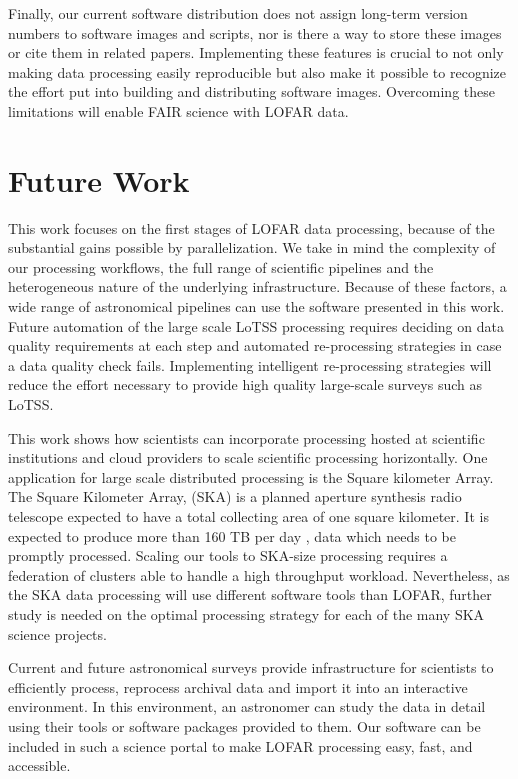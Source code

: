 Finally, our current software distribution does not assign long-term version numbers to software images and scripts, nor is there a way to store these images or cite them in related papers. Implementing these features is crucial to not only making data processing easily reproducible but also make it possible to recognize the effort put into building and distributing software images. Overcoming these limitations will enable FAIR science with LOFAR data\citep{wilkinson2016fair}.


\section{Future Work}

This work focuses on the first stages of LOFAR data processing, because of the substantial gains possible by parallelization. We take in mind the complexity of our processing workflows, the full range of scientific pipelines and the heterogeneous nature of the underlying infrastructure. Because of these factors, a wide range of astronomical pipelines can use the software presented in this work. Future automation of the large scale LoTSS processing requires deciding on data quality requirements at each step and automated re-processing strategies in case a data quality check fails. Implementing intelligent re-processing strategies will reduce the effort necessary to provide high quality large-scale surveys such as LoTSS. 

This work shows how scientists can incorporate processing hosted at scientific institutions and cloud providers to scale scientific processing horizontally. One application for large scale distributed processing is the Square kilometer Array. The Square Kilometer Array, (SKA) is a planned aperture synthesis radio telescope expected to have a total collecting area of one square kilometer. It is expected to produce more than 160 TB per day \citep{johnston2017taming}, data which needs to be promptly processed. Scaling our tools to SKA-size processing requires a federation of clusters able to handle a high throughput workload. Nevertheless, as the SKA data processing will use different software tools than LOFAR, further study is needed on the optimal processing strategy for each of the many SKA science projects.

Current and future astronomical surveys provide infrastructure for scientists to efficiently process, reprocess archival data and import it into an interactive environment. In this environment, an astronomer can study the data in detail using their tools or software packages provided to them. Our software can be included in such a science portal to make LOFAR processing easy, fast, and accessible.

